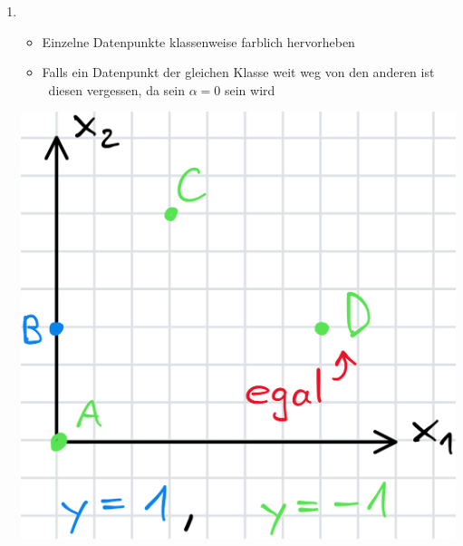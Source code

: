 \begin{enumerate}
    \item {} \\
    \begin{minipage}[c]{0.6\columnwidth}
        \begin{itemize}
            \item Einzelne Datenpunkte klassenweise farblich hervorheben
            \item Falls ein Datenpunkt der gleichen Klasse weit weg von den anderen ist\\
            \textrightarrow\ diesen vergessen, da sein $\alpha = 0$ sein wird
        \end{itemize}
    \end{minipage}\hfill
    \begin{minipage}[c]{0.33\columnwidth}
        \includegraphics[width=\columnwidth]{images/SVM_2.png}
    \end{minipage}
    

\end{enumerate}
